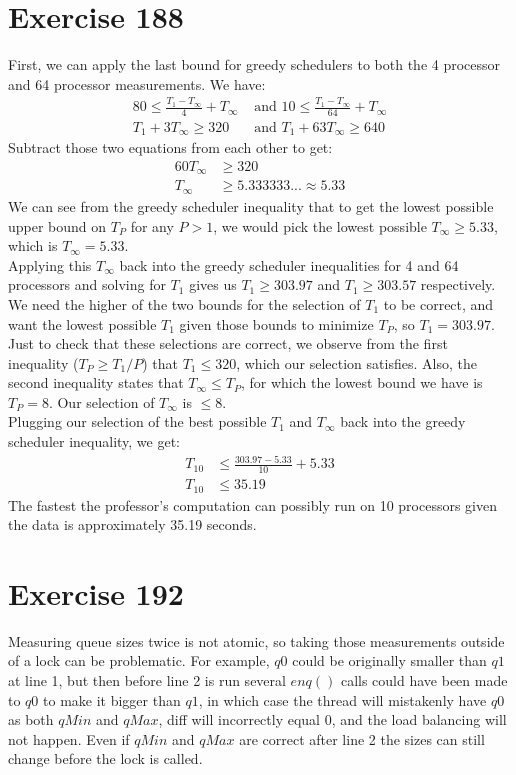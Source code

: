 \documentclass{article}
\begin{document}
\begin{adjustwidth}{-2cm}{-2cm}
\section{Exercise 188}
First, we can apply the last bound for greedy schedulers to both the 4 processor and 64 processor measurements. We have:\begin{align*}
80 \leq \frac{T_{1}-T_{\infty}}{4} + T_{\infty} &\text{ and } 10 \leq \frac{T_{1}-T_{\infty}}{64} + T_{\infty}\\
T_{1}+3T_{\infty} \geq 320 &\text{ and } T_{1}+63T_{\infty} \geq 640
\end{align*}
Subtract those two equations from each other to get:\begin{align*}
60T_{\infty} &\geq 320\\
T_{\infty} &\geq 5.333333... \approx 5.33
\end{align*}
We can see from the greedy scheduler inequality that to get the lowest possible upper bound on $T_{P}$ for any $P > 1$, we would pick the lowest possible $T_{\infty} \geq 5.33$, which is $T_{\infty} = 5.33$.\\
Applying this $T_{\infty}$ back into the greedy scheduler inequalities for 4 and 64 processors and solving for $T_{1}$ gives us $T_{1} \geq 303.97$ and $T_{1} \geq 303.57$ respectively. We need the higher of the two bounds for the selection of $T_{1}$ to be correct, and want the lowest possible $T_{1}$ given those bounds to minimize $T_{P}$, so $T_{1} = 303.97$.\\
Just to check that these selections are correct, we observe from the first inequality ($T_{P} \geq T_{1}/P$) that $T_{1} \leq 320$, which our selection satisfies. Also, the second inequality states that $T_{\infty} \leq T_{P}$, for which the lowest bound we have is $T_{P} = 8$. Our selection of $T_{\infty}$ is $\leq 8$.\\
Plugging our selection of the best possible $T_{1}$ and $T_{\infty}$ back into the greedy scheduler inequality, we get:\begin{align*}
T_{10} &\leq \frac{303.97-5.33}{10} + 5.33\\
T_{10} &\leq 35.19
\end{align*}
The fastest the professor's computation can possibly run on 10 processors given the data is approximately 35.19 seconds.
\section{Exercise 192}
Measuring queue sizes twice is not atomic, so taking those measurements outside of a lock can be problematic. For example, $q0$ could be originally smaller than $q1$ at line 1, but then before line 2 is run several $enq()$ calls could have been made to $q0$ to make it bigger than $q1$, in which case the thread will mistakenly have $q0$ as both $qMin$ and $qMax$, diff will incorrectly equal 0, and the load balancing will not happen. Even if $qMin$ and $qMax$ are correct after line 2 the sizes can still change before the lock is called.
\end{adjustwidth}
\end{document}
